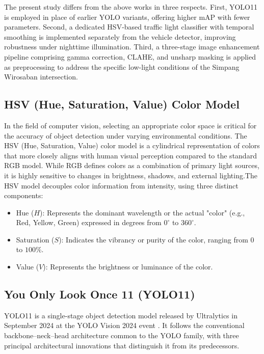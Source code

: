 The present study differs from the above works in three respects. First, YOLO11 is employed in place of earlier YOLO variants, offering higher mAP with fewer parameters. Second, a dedicated HSV-based traffic light classifier with temporal smoothing is implemented separately from the vehicle detector, improving robustness under nighttime illumination. Third, a three-stage image enhancement pipeline comprising gamma correction, CLAHE, and unsharp masking is applied as preprocessing to address the specific low-light conditions of the Simpang Wirosaban intersection.

\subsection{HSV (Hue, Saturation, Value) Color Model}
In the field of computer vision, selecting an appropriate color space is critical for the accuracy of object detection under varying environmental conditions. The HSV (Hue, Saturation, Value) color model is a cylindrical representation of colors that more closely aligns with human visual perception compared to the standard RGB model. While RGB defines colors as a combination of primary light sources, it is highly sensitive to changes in brightness, shadows, and external lighting.The HSV model decouples color information from intensity, using three distinct components:
\begin{itemize}
    \item Hue ($H$): Represents the dominant wavelength or the actual "color" (e.g., Red, Yellow, Green) expressed in degrees from $0^{\circ}$ to $360^{\circ}$.
    \item Saturation ($S$): Indicates the vibrancy or purity of the color, ranging from $0$ to $100\%$.
    \item Value ($V$): Represents the brightness or luminance of the color.
\end{itemize}

\subsection{You Only Look Once 11 (YOLO11)}

YOLO11 is a single-stage object detection model released by Ultralytics in September 2024 at the YOLO Vision 2024 event \cite{ultralytics2024}. It follows the conventional backbone–neck–head architecture common to the YOLO family, with three principal architectural innovations that distinguish it from its predecessors.

